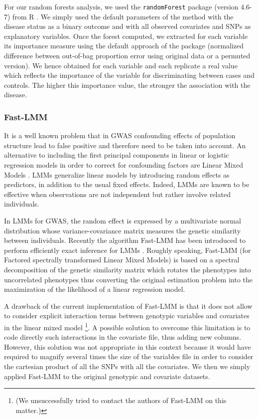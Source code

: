 \documentclass[10pt,a4paper]{article}
\begin{document}
For our random forests analysis, we used the {\tt randomForest} package (version 4.6-7) from R \citep{R2013}. We simply used the default parameters of the method with the disease status as a binary outcome and with all observed covariates and SNPs as explanatory variables. Once the forest computed, we extracted for each variable its importance measure using the default approach of the package (normalized difference between out-of-bag proportion error using original data or a permuted version). We hence obtained for each variable and each replicate a real value which reflects the importance of the variable for discriminating between cases and controls. The higher this importance value, the stronger the association with the disease.

\subsubsection{Fast-LMM}\label{sec:lmm}

It is a well known problem that in GWAS confounding effects of population structure lead to false positive and therefore need to be taken into account. An alternative to including the first principal components in linear or logistic regression models in order to correct for confounding factors are Linear Mixed Models \citep[LMMs,][]{10.1371/journal.pone.0075707}. LMMs generalize linear models by introducing random effects as predictors, in addition to the usual fixed effects. Indeed, LMMs are known to be effective when observations are not independent but rather involve related individuals.

In LMMs for GWAS, the random effect is expressed by a multivariate normal distribution whose variance-covariance matrix measures the genetic similarity between individuals. Recently the algorithm Fast-LMM has been introduced to perform efficiently exact inference for LMMs \citep{lippert2011fast}. Roughly speaking, Fast-LMM (for  Factored spectrally transformed Linear Mixed Models) is based on a spectral decomposition of the genetic similarity matrix which rotates the phenotypes into uncorrelated phenotypes thus converting the original estimation problem into the maximization of the likelihood of a linear regression model.  

A drawback of the current implementation of Fast-LMM is that it does not allow to consider explicit interaction terms between genotypic variables and covariates in the linear mixed model \footnote{(We unsuccessfully tried to contact the authors of Fast-LMM on this matter.)}. A possible solution to overcome this limitation is to code directly such interactions in the covariate file, thus adding new columns. However, this solution was not appropriate in this context because it would have required to magnify several times the size of the variables file in order to consider the cartesian product of all the SNPs with all the covariates. We then we simply applied Fast-LMM to the original genotypic and covariate datasets.
\end{document}
